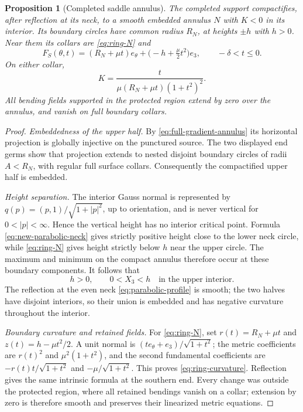 \documentclass[11pt]{amsart}
\newtheorem{proposition}[theorem]{Proposition}
\theoremstyle{definition}
\theoremstyle{remark}
\numberwithin{equation}{section}
\begin{document}
\begin{proposition}[Completed saddle annulus]\label{prop:saddle}
The completed support compactifies, after reflection at its neck,
to a smooth embedded annulus $N$ with $K<0$ in its interior. Its
boundary circles have common radius $R_N$, at heights $\pm h$ with
$h>0$. Near them its collars are \eqref{eq:ring-N} and
\begin{equation}\label{eq:ring-S}
 F_S(\theta,t)=(R_N+\mu t)e_\theta
       +\bigl(-h+\tfrac\mu2t^2\bigr)e_3,
 \qquad -\delta<t\le0.
\end{equation}
On either collar,
\begin{equation}\label{eq:ring-curvature}
 K=\frac{t}{\mu(R_N+\mu t)(1+t^2)^2}.
\end{equation}
All bending fields supported in the protected region extend by zero
over the annulus, and vanish on full boundary collars.
\end{proposition}
\begin{proof}
\emph{Embeddedness of the upper half.}
By \eqref{eq:full-gradient-annulus} its horizontal projection is
globally injective on the punctured source. The two displayed end
germs show that projection extends to nested disjoint boundary
circles of radii $A<R_N$, with regular full surface collars.
Consequently the compactified upper half is embedded.

\emph{Height separation.}
The interior Gauss normal is represented by
$q(p)=(p,1)/\sqrt{1+|p|^2}$, up to orientation, and is never vertical
for $0<|p|<\infty$. Hence the vertical height has no interior
critical point. Formula \eqref{eq:new-parabolic-neck} gives strictly
positive height close to the lower neck circle, while
\eqref{eq:ring-N} gives height strictly below $h$ near the upper
circle. The maximum and minimum on the compact annulus therefore
occur at these boundary components. It follows that
\[
 h>0,\qquad 0<X_3<h\quad\text{in the upper interior}.
\]
The reflection at the even neck \eqref{eq:parabolic-profile} is
smooth; the two halves have disjoint interiors, so their union is
embedded and has negative curvature throughout the interior.

\emph{Boundary curvature and retained fields.}
For \eqref{eq:ring-N}, set $r(t)=R_N+\mu t$ and
$z(t)=h-\mu t^2/2$. A unit normal is
$(t e_\theta+e_3)/\sqrt{1+t^2}$; the metric coefficients are
$r(t)^2$ and $\mu^2(1+t^2)$, and the second fundamental
coefficients are $-r(t)t/\sqrt{1+t^2}$ and
$-\mu/\sqrt{1+t^2}$. This proves \eqref{eq:ring-curvature}.
Reflection gives the same intrinsic formula at the southern end.
Every change was outside the protected region, where all retained
bendings vanish on a collar; extension by zero is therefore smooth
and preserves their linearized metric equations.
\end{proof}
\end{document}
